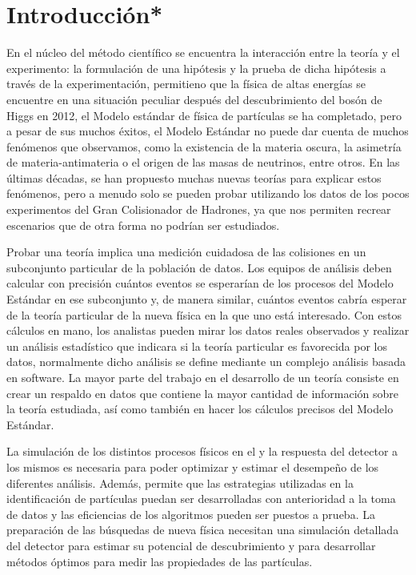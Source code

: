 \chapter*{Introducción*}
En el núcleo del método científico se encuentra la interacción entre la teoría y el experimento: la formulación de una hipótesis y la prueba de dicha hipótesis a través de la experimentación, permitieno que la física de altas energías se encuentre en una situación peculiar después del descubrimiento del bosón de Higgs en 2012, el Modelo estándar de física de partículas se ha completado, pero a pesar de sus muchos éxitos, el Modelo Estándar no puede dar cuenta de muchos fenómenos que observamos, como la existencia de la materia oscura, la asimetría de materia-antimateria o el origen de las masas de neutrinos, entre otros. En las últimas décadas, se han propuesto muchas nuevas teorías para explicar estos fenómenos, pero a menudo solo se pueden probar utilizando los datos de los pocos experimentos del Gran Colisionador de Hadrones, ya que nos permiten recrear escenarios que de otra forma no podrían ser estudiados. 
 
Probar una teoría implica una medición cuidadosa de las colisiones en un subconjunto particular de la población de datos. Los equipos de análisis deben calcular con precisión cuántos eventos se esperarían de los procesos del Modelo Estándar en ese subconjunto y, de manera similar, cuántos eventos cabría esperar de la teoría particular de la nueva física en la que uno está interesado. Con estos cálculos en mano, los analistas pueden mirar los datos reales observados y realizar un análisis estadístico que indicara si la teoría particular es favorecida por los datos, normalmente dicho análisis se define mediante un complejo análisis basada en software. La mayor parte del trabajo en el desarrollo de un teoría consiste en crear un respaldo en datos que contiene la mayor cantidad de información sobre la teoría estudiada, así como también en hacer los cálculos precisos del Modelo Estándar.


La simulación de los distintos procesos físicos en el \LHC y la respuesta del detector a los mismos es necesaria para poder optimizar y estimar el desempeño de los diferentes análisis. Además, permite que las estrategias utilizadas en la identificación de partículas puedan ser desarrolladas con anterioridad a la toma de datos y las eficiencias de los algoritmos pueden ser puestos a prueba. La preparación de las búsquedas de nueva física necesitan una simulación detallada del detector para estimar su potencial de descubrimiento y para desarrollar métodos óptimos para medir las propiedades de las partículas.


